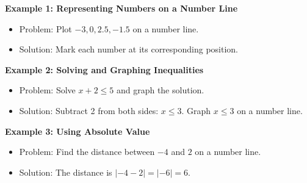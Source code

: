 \documentclass[12pt]{article}
\begin{document}
\begin{tcolorbox}[colframe=black!60, colback=white, 
coltitle=black, colbacktitle=black!15, fonttitle=\bfseries\Large, 
title=Examples, halign title=center, left=10pt, right=10pt, top=10pt, bottom=15pt]
\textbf{Example 1: Representing Numbers on a Number Line}
\begin{itemize}
    \item Problem: Plot \( -3, 0, 2.5, -1.5 \) on a number line.
    \item Solution: Mark each number at its corresponding position.
    \begin{center}
    \end{center}
\end{itemize}

\textbf{Example 2: Solving and Graphing Inequalities}
\begin{itemize}
    \item Problem: Solve \( x + 2 \leq 5 \) and graph the solution.
    \item Solution: Subtract 2 from both sides: \( x \leq 3 \). Graph \( x \leq 3 \) on a number line.
    \begin{center}
    \end{center}
\end{itemize}

\textbf{Example 3: Using Absolute Value}
\begin{itemize}
    \item Problem: Find the distance between \( -4 \) and \( 2 \) on a number line.
    \item Solution: The distance is \( |-4 - 2| = | -6 | = 6 \).
\end{itemize}
\end{tcolorbox}
\end{document}

